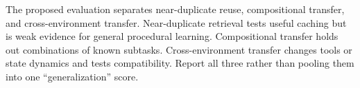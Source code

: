 The proposed evaluation separates near-duplicate reuse, compositional transfer, and cross-environment transfer. Near-duplicate retrieval tests useful caching but is weak evidence for general procedural learning. Compositional transfer holds out combinations of known subtasks. Cross-environment transfer changes tools or state dynamics and tests compatibility. Report all three rather than pooling them into one ``generalization'' score.

